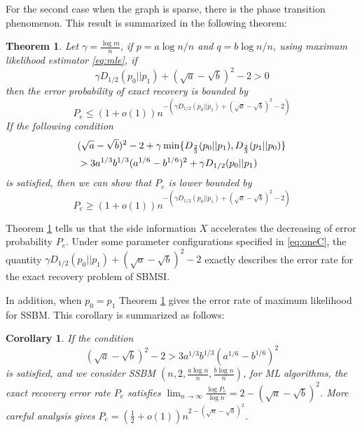 \documentclass[conference]{IEEEtran}
\newtheorem{theorem}{Theorem}
\newtheorem{corollary}{Corollary}
\begin{document}
For the second case when the graph is sparse, there is the phase transition phenomenon. This result
is summarized
in the following theorem:
\begin{theorem}\label{thm:Pe}
Let $\gamma = \frac{\log m}{n}$, if $p = a \log n /n$ and $q = b \log n / n$, using maximum likelihood estimator \eqref{eq:mle},
if
\begin{equation}\label{eq:positive_condition}
\gamma D_{1/2}(p_0||p_1) + (\sqrt{a} - \sqrt{b})^2-2 > 0
\end{equation}
then the error probability
of exact recovery is bounded by
\begin{equation}\label{eq:PeMain}
P_e \leq (1+o(1)) n^{-\left(\gamma D_{1/2}(p_0||p_1) + (\sqrt{a} - \sqrt{b})^2-2\right)}
\end{equation}
If the following condition
\begin{align}
&(\sqrt{a}-\sqrt{b})^2-2 + \gamma \min \{D_{\frac{2}{3}}(p_0||p_1), D_{\frac{2}{3}}(p_1||p_0) \} \notag \\
&> 3a^{1/3}b^{1/3}(a^{1/6}-b^{1/6})^2 + \gamma D_{1/2}(p_0||p_1)\label{eq:oneC}
\end{align}
is satisfied, then we can show that $P_e$ is lower bounded by
\begin{equation}\label{eq:PeMainL}
P_e \geq (1+o(1)) n^{-\left(\gamma D_{1/2}(p_0||p_1) + (\sqrt{a} - \sqrt{b})^2-2\right)}
\end{equation}
\end{theorem}
Theorem \ref{thm:Pe} tells us that the side information $X$ accelerates the
decreasing of error probability $P_e$. Under some parameter configurations specified in \eqref{eq:oneC},
the quantity $\gamma D_{1/2}(p_0||p_1) + (\sqrt{a} - \sqrt{b})^2-2$
exactly describes the error rate for the exact recovery problem of SBMSI.

In addition, when $p_0=p_1$
Theorem \ref{thm:Pe} gives the error rate of maximum likelihood for SSBM. This corollary is
summarized as follows:
\begin{corollary}
If the condition
\begin{equation}
(\sqrt{a}-\sqrt{b})^2-2 > 3a^{1/3}b^{1/3}(a^{1/6}-b^{1/6})^2
\end{equation}
is satisfied,
 and we consider SSBM $(n, 2, \frac{a\log n}{n}, \frac{b \log n}{n})$, for ML algorithms, the exact recovery error rate $P_e$ satisfies
$\lim_{n\to \infty} \frac{\log P_e}{\log n} =2-(\sqrt{a} - \sqrt{b})^2$.
More careful analysis gives  $P_e = (\frac{1}{2}+o(1))n^{2-(\sqrt{a} - \sqrt{b})^2}$.
\end{corollary}
\end{document}

